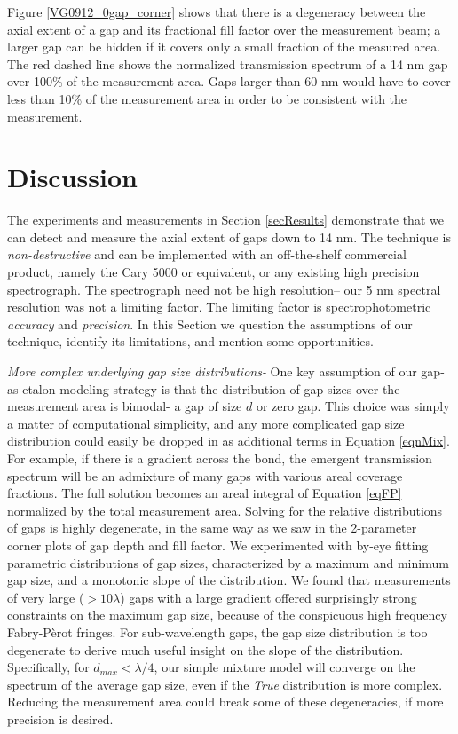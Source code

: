 Figure \ref{VG0912_0gap_corner} shows that there is a degeneracy between the axial extent of a gap and its fractional fill factor over the measurement beam; a larger gap can be hidden if it covers only a small fraction of the measured area.  The red dashed line shows the normalized transmission spectrum of a 14 nm gap over 100\% of the measurement area.  Gaps larger than 60 nm would have to cover less than 10\% of the measurement area in order to be consistent with the measurement.


\section{Discussion}

The experiments and measurements in Section \ref{secResults} demonstrate that we can detect and measure the axial extent of gaps down to 14 nm.  The technique is \emph{non-destructive} and can be implemented with an off-the-shelf commercial product, namely the Cary 5000 or equivalent, or any existing high precision spectrograph.  The spectrograph need not be high resolution-- our 5 nm spectral resolution was not a limiting factor.  The limiting factor is spectrophotometric \emph{accuracy} and \emph{precision}.  In this Section we question the assumptions of our technique, identify its limitations, and mention some opportunities.

\emph{More complex underlying gap size distributions-} One key assumption of our gap-as-etalon modeling strategy is that the distribution of gap sizes over the measurement area is bimodal- a gap of size $d$ or zero gap.  This choice was simply a matter of computational simplicity, and any more complicated gap size distribution could easily be dropped in as additional terms in Equation \ref{eqnMix}.  For example, if there is a gradient across the bond, the emergent transmission spectrum will be an admixture of many gaps with various areal coverage fractions.  The full solution becomes an areal integral of Equation \ref{eqFP} normalized by the total measurement area.  Solving for the relative distributions of gaps is highly degenerate, in the same way as we saw in the 2-parameter corner plots of gap depth and fill factor.  We experimented with by-eye fitting parametric distributions of gap sizes, characterized by a maximum and minimum gap size, and a monotonic slope of the distribution.  We found that measurements of very large ($>10\lambda$) gaps with a large gradient offered surprisingly strong constraints on the maximum gap size, because of the conspicuous high frequency Fabry-P\`erot fringes.  For sub-wavelength gaps, the gap size distribution is too degenerate to derive much useful insight on the slope of the distribution.  Specifically, for $d_{max}<\lambda/4$, our simple mixture model will converge on the spectrum of the average gap size, even if the \emph{True} distribution is more complex.  Reducing the measurement area could break some of these degeneracies, if more precision is desired.


